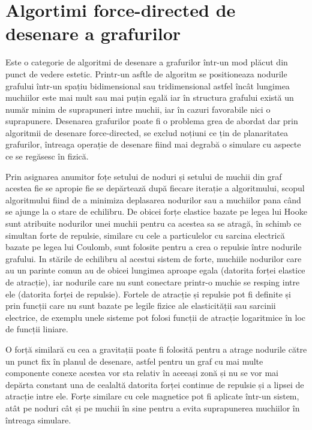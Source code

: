 \newpage
\section{Algortimi force-directed de desenare a grafurilor}

Este o categorie de algoritmi de desenare a grafurilor într-un mod plăcut din punct de vedere estetic. 
Printr-un asftle de algoritm se positioneaza nodurile grafului într-un spațiu bidimensional sau tridimensional astfel încât 
lungimea muchiilor este mai mult sau mai puțin egală iar în structura grafului există un număr minim de suprapuneri intre muchii, 
iar în cazuri favorabile nici o suprapunere. Desenarea grafurilor poate fi o problema grea de abordat dar prin algoritmii 
de desenare force-directed, se exclud noțiuni ce țin de planaritatea grafurilor, întreaga operație de desenare fiind mai 
degrabă o simulare cu aspecte ce se regăsesc în fizică.\newline

Prin asignarea anumitor foțe setului de  noduri și setului de muchii din graf acestea fie se apropie fie se depărtează după 
fiecare iterație a algoritmului, scopul algoritmului fiind de a minimiza deplasarea nodurilor sau a muchiilor pana când se 
ajunge la o stare de echilibru. De obicei forțe elastice bazate pe legea lui Hooke sunt atribuite nodurilor unei muchii 
pentru ca acestea sa se atragă, în schimb ce simultan forte de repulsie, similare cu cele a particulelor cu sarcina electrică 
bazate pe legea lui Coulomb, sunt folosite pentru a crea o repulsie între nodurile grafului. In stările de echilibru al acestui sistem de forte, 
muchiile nodurilor care au un parinte comun au de obicei lungimea aproape egala (datorita forței elastice de atracție), 
iar nodurile care nu sunt conectare printr-o muchie se resping intre ele (datorita forței de repulsie). Fortele de atracție și repulsie pot fi definite și prin funcții 
care nu sunt bazate pe legile fizice ale elasticității sau sarcinii electrice, de exemplu unele sisteme pot folosi funcții de 
atracție logaritmice în loc de funcții liniare.\newline

O forță similară cu cea a gravitații poate fi folosită pentru a atrage nodurile către un punct fix în planul de desenare, 
astfel pentru un graf cu mai multe componente conexe acestea vor sta relativ în aceeași zonă și nu se vor mai depărta 
constant una de cealaltă datorita forței continue de repulsie și a lipsei de atracție intre ele. Forțe similare cu cele 
magnetice pot fi aplicate într-un sistem, atât pe noduri cât și pe muchii în sine pentru a evita suprapunerea muchiilor 
în întreaga simulare.\newline

